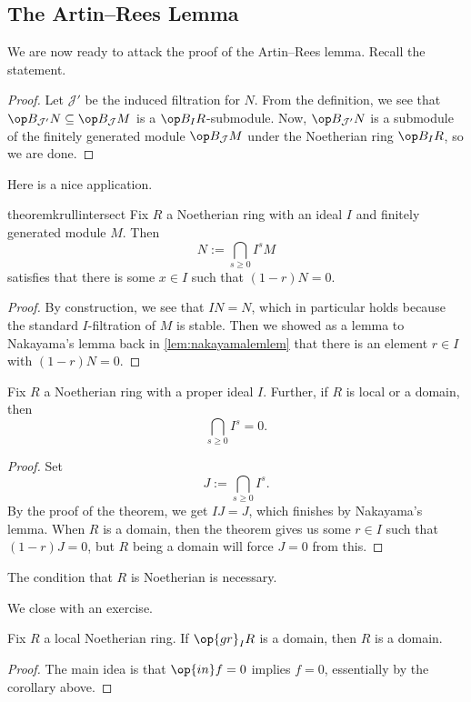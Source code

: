 \subsection{The Artin--Rees Lemma}
We are now ready to attack the proof of the Artin--Rees lemma. Recall the statement.
\artinrees*
\begin{proof}
	Let $\mathcal J'$ be the induced filtration for $N$. From the definition, we see that $\op B_{\mathcal J'}N\subseteq\op B_\mathcal JM$ is a $\op B_IR$-submodule. Now, $\op B_{\mathcal J'}N$ is a submodule of the finitely generated module $\op B_\mathcal JM$ under the Noetherian ring $\op B_IR$, so we are done.
\end{proof}
Here is a nice application.
\begin{restatable}{theorem}{krullintersect}
	Fix $R$ a Noetherian ring with an ideal $I$ and finitely generated module $M$. Then
	\[N:=\bigcap_{s\ge0}I^sM\]
	satisfies that there is some $x\in I$ such that $(1-r)N=0$.
\end{restatable}
\begin{proof}
	By construction, we see that $IN=N$, which in particular holds because the standard $I$-filtration of $M$ is stable. Then we showed as a lemma to Nakayama's lemma back in \autoref{lem:nakayamalemlem} that there is an element $r\in I$ with $(1-r)N=0$.
\end{proof}
\begin{corollary}
	Fix $R$ a Noetherian ring with a proper ideal $I$. Further, if $R$ is local or a domain, then
	\[\bigcap_{s\ge0}I^s=0.\]
\end{corollary}
\begin{proof}
	Set
	\[J:=\bigcap_{s\ge0}I^s.\]
	By the proof of the theorem, we get $IJ=J$, which finishes by Nakayama's lemma. When $R$ is a domain, then the theorem gives us some $r\in I$ such that $(1-r)J=0$, but $R$ being a domain will force $J=0$ from this.
\end{proof}
\begin{remark}
	The condition that $R$ is Noetherian is necessary.
\end{remark}
We close with an exercise.
\begin{exe}
	Fix $R$ a local Noetherian ring. If $\op{gr}_IR$ is a domain, then $R$ is a domain.
\end{exe}
\begin{proof}
	The main idea is that $\op{in}f=0$ implies $f=0$, essentially by the corollary above.
\end{proof}